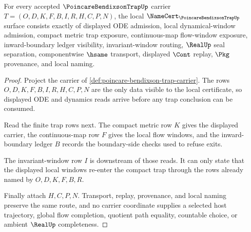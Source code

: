 \begin{theorem}
\label{thm:poincare-bendixson-trap-namecert-obligations}
For every accepted $\PoincareBendixsonTrapUp$ carrier $T=(O,D,K,F,B,I,R,H,C,P,N)$, the local $\NameCert_{\PoincareBendixsonTrapUp}$ surface consists exactly of displayed ODE admission, local dynamical-window admission, compact metric trap exposure, continuous-map flow-window exposure, inward-boundary ledger visibility, invariant-window routing, $\RealUp$ seal separation, componentwise $\hsame$ transport, displayed $\Cont$ replay, $\Pkg$ provenance, and local naming.
\end{theorem}
\begin{proof}
Project the carrier of \autoref{def:poincare-bendixson-trap-carrier}. The rows $O,D,K,F,B,I,R,H,C,P,N$ are the only data visible to the local certificate, so displayed ODE and dynamics reads arrive before any trap conclusion can be consumed.

Read the finite trap rows next. The compact metric row $K$ gives the displayed carrier, the continuous-map row $F$ gives the local flow windows, and the inward-boundary ledger $B$ records the boundary-side checks used to refuse exits.

The invariant-window row $I$ is downstream of those reads. It can only state that the displayed local windows re-enter the compact trap through the rows already named by $O,D,K,F,B,R$.

Finally attach $H,C,P,N$. Transport, replay, provenance, and local naming preserve the same route, and no carrier coordinate supplies a selected host trajectory, global flow completion, quotient path equality, countable choice, or ambient $\RealUp$ completeness.
\end{proof}

